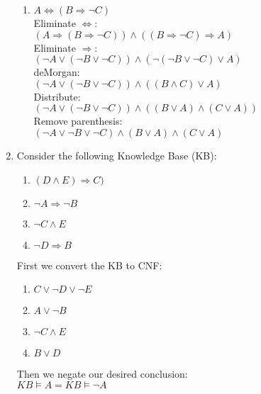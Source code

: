 \documentclass[paper=a4, fontsize=11pt]{scrartcl} %
\numberwithin{equation}{section} %
\numberwithin{figure}{section} %
\numberwithin{table}{section} %
\begin{document}
\begin{enumerate}
\begin{enumerate}
		\item
		$A \Leftrightarrow (B \Rightarrow \neg C)$
		\\Eliminate $\Leftrightarrow$:\\
		$(A \Rightarrow (B \Rightarrow \neg C)) \wedge ((B \Rightarrow \neg C) \Rightarrow A)$
		\\Eliminate $\Rightarrow$:\\
		$(\neg A \vee (\neg B \vee \neg C)) \wedge (\neg(\neg B \vee \neg C) \vee A)$
		\\deMorgan:\\
		$(\neg A \vee (\neg B \vee \neg C)) \wedge ((B \wedge C) \vee A)$
		\\Distribute:\\
		$(\neg A \vee (\neg B \vee \neg C)) \wedge ((B \vee A) \wedge (C \vee A))$
		\\Remove parenthesis:\\
		$(\neg A \vee \neg B \vee \neg C) \wedge (B \vee A) \wedge (C \vee A)$
	\end{enumerate}
	
	\item
	Consider the following Knowledge Base (KB):
	\begin{enumerate}
		\item $(D \wedge E) \Rightarrow C)$
		\item $\neg A \Rightarrow \neg B$
		\item $\neg C \wedge E$
		\item $\neg D \Rightarrow B$
	\end{enumerate}
	First we convert the KB to CNF:
	\begin{enumerate}
		\item
		$C \vee \neg D \vee \neg E$
		\item
		$A \vee \neg B$
		\item
		$\neg C \wedge E$
		\item
		$B \vee D$
	\end{enumerate}

	Then we negate our desired conclusion:\\
	$KB \models A = KB \models \neg A$ \\
	

\end{enumerate}
\end{document}
